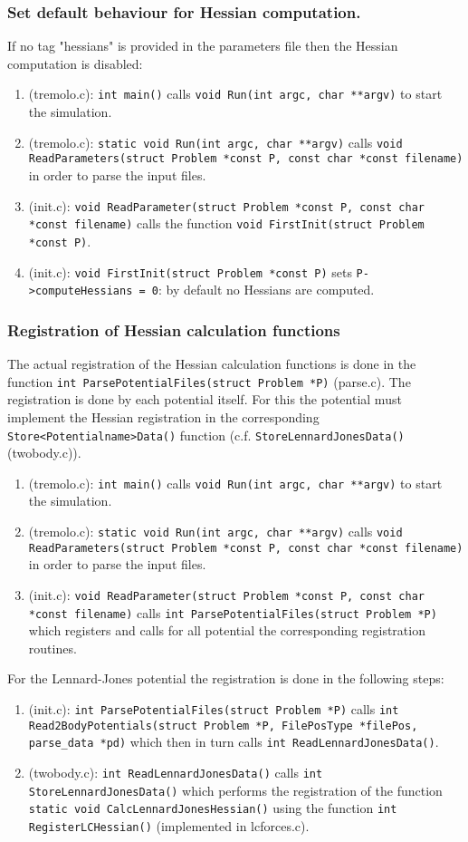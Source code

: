 \documentclass[11pt]{article}
\begin{document}
\subsubsection{Set default behaviour for Hessian computation.}
\label{sec-1-3-1}
If no tag "hessians" is provided in the parameters file then the Hessian computation is disabled:
\begin{enumerate}
\item (tremolo.c): \texttt{int main()} calls \texttt{void Run(int argc, char **argv)} to start the simulation.
\item (tremolo.c): \texttt{static void Run(int argc, char **argv)} calls \texttt{void ReadParameters(struct Problem *const P, const char *const filename)} in order to parse the input files.
\item (init.c): \texttt{void ReadParameter(struct Problem *const P, const char *const filename)} calls the function \texttt{void FirstInit(struct Problem *const P)}.
\item (init.c): \texttt{void FirstInit(struct Problem *const P)} sets \texttt{P->computeHessians = 0}: by default no Hessians are computed.
\end{enumerate}
\subsubsection{Registration of Hessian calculation functions}
\label{sec-1-3-2}
The actual registration of the Hessian calculation functions is done in the function \texttt{int ParsePotentialFiles(struct Problem *P)} (parse.c). The registration is done by each potential itself. For this the potential must implement the Hessian registration in the corresponding \texttt{Store<Potentialname>Data()} function (c.f. \texttt{StoreLennardJonesData()} (twobody.c)).
\begin{enumerate}
\item (tremolo.c): \texttt{int main()} calls \texttt{void Run(int argc, char **argv)} to start the simulation.
\item (tremolo.c): \texttt{static void Run(int argc, char **argv)} calls \texttt{void ReadParameters(struct Problem *const P, const char *const filename)} in order to parse the input files.
\item (init.c): \texttt{void ReadParameter(struct Problem *const P, const char *const filename)} calls \texttt{int ParsePotentialFiles(struct Problem *P)} which registers and calls for all potential the corresponding registration routines.
\end{enumerate}
For the Lennard-Jones potential the registration is done in the following steps:
\begin{enumerate}
\item (init.c): \texttt{int ParsePotentialFiles(struct Problem *P)} calls \texttt{int Read2BodyPotentials(struct Problem *P, FilePosType *filePos, parse\_data *pd)} which then in turn calls \texttt{int ReadLennardJonesData()}.
\item (twobody.c): \texttt{int ReadLennardJonesData()} calls \texttt{int StoreLennardJonesData()} which performs the registration of the function \texttt{static void CalcLennardJonesHessian()} using the function \texttt{int RegisterLCHessian()} (implemented in lcforces.c).
\end{enumerate}
\end{document}
